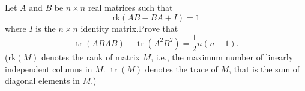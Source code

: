 \documentclass{article}
\DeclareMathOperator{\tr}{tr}
\begin{document}
\setlength{\parindent}{0pt}
Let \(\displaystyle A\) and \(\displaystyle B\) be \(\displaystyle n\times n\) real matrices  such that$$\textrm{rk}(AB-BA+I)=1$$where \(\displaystyle I\) is the \(\displaystyle n\times n\) identity matrix.\newline Prove that$$\tr(ABAB)-\tr(A^2B^2)=\frac12 n(n-1).$$
(\(\displaystyle \textrm{rk}(M)\) denotes the rank of matrix \(\displaystyle M\), i.e., the maximum number of linearly independent columns in \(\displaystyle M\). \(\displaystyle\tr(M)\) denotes the trace of \(\displaystyle M\), that is the sum of diagonal elements in \(\displaystyle M\).)
\end{document}
